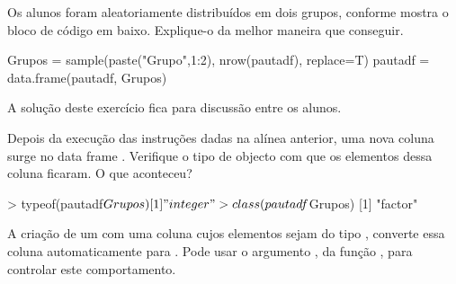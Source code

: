 \documentclass{exam}
\begin{document}
\begin{questions}
%
%	

%

\question Os alunos foram aleatoriamente distribuídos em dois grupos, conforme mostra o bloco de código em baixo. Explique-o da melhor maneira que conseguir.
\begin{rcode}
	Grupos = sample(paste("Grupo",1:2), nrow(pautadf), replace=T)
	pautadf = data.frame(pautadf, Grupos)
\end{rcode}

\begin{solution}
	A solução deste exercício fica para discussão entre os alunos.
\end{solution}

\question Depois da execução das instruções dadas na alínea anterior, uma nova coluna surge no data frame . Verifique o tipo de objecto com que os elementos dessa coluna ficaram. O que aconteceu?

\begin{solution}
	\begin{rcode}
		> typeof(pautadf$Grupos)
		[1] "integer"
		> class(pautadf$Grupos)
		[1] "factor"
	\end{rcode}
	A criação de um  com uma coluna cujos elementos sejam do tipo , converte essa coluna automaticamente para . Pode usar o argumento , da função , para controlar este comportamento.
\end{solution}


\end{questions}
\end{document}

